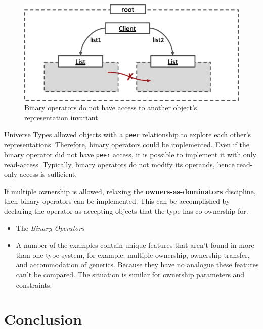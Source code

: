 \documentclass{acm_proc_article-sp}
\begin{document}
\begin{figure}[t]
	\centering
	\includegraphics{binary-fail.eps}
	\caption{Binary operators do not have access to another object's 
		representation invariant}
	\label{fig:binary-operators}
\end{figure}

Universe Types allowed objects with a \lstinline|peer| \cite{dietl11gut}
relationship to explore each other's representations. Therefore, binary
operators could be implemented. Even if the binary operator did not have
\lstinline|peer| access, it is possible to implement it with only read-access.
Typically, binary operators do not modify its operands, hence read-only access
is sufficient.

If multiple ownership is allowed, relaxing the \textbf{owners-as-dominators}
discipline, then binary operators can be implemented. This can be accomplished
by declaring the operator as accepting objects that the type has co-ownership
for.



\begin{itemize}

	\item The \textit{Binary Operators} 
	
	\item A number of the examples contain unique features that aren't found in
		more than one type system, for example: multiple ownership, ownership
		transfer, and accommodation of generics. Because they have no analogue
		these features can't be compared. The situation is similar for ownership
		parameters and constraints.

\end{itemize}

\section{Conclusion}
\label{sec:conclusion}
\end{document}
